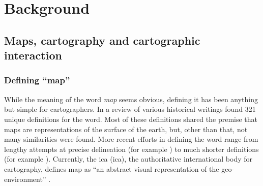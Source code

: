 \section{Background}



\subsection{Maps, cartography and cartographic interaction}

\subsubsection{Defining \enquote{map}}
While the meaning of the word \textit{map} seems obvious,
defining it has been anything but simple for cartographers.
In a review of various historical writings \textcite{and1996}
found 321 unique definitions for the word.
Most of these definitions shared the premise that
maps are representations of the surface of the earth,
but, other than that, not many similarities were found.
More recent efforts in defining the word range
from lengthy attempts at precise delineation
(for example \textcite{ica2003})
to much shorter definitions (for example \textcite{kra2017}).
Currently, the \acrlong{ica} (\acrshort{ica}),
the authoritative international body for cartography,
defines map as \enquote{an abstract visual representation of the geo-environment}
\parencite{ica2019}.

